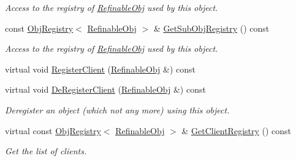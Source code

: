 \begin{DoxyCompactItemize}
\begin{DoxyCompactList}\small\item\em Access to the registry of \mbox{\hyperlink{class_obj_cryst_1_1_refinable_obj}{Refinable\+Obj}} used by this object. \end{DoxyCompactList}\item 
\mbox{\label{class_obj_cryst_1_1_refinable_obj_aa20aa3c1456578c35d2420c6668cf3aa}} 
const \mbox{\hyperlink{class_obj_cryst_1_1_obj_registry}{Obj\+Registry}}$<$ \mbox{\hyperlink{class_obj_cryst_1_1_refinable_obj}{Refinable\+Obj}} $>$ \& \mbox{\hyperlink{class_obj_cryst_1_1_refinable_obj_aa20aa3c1456578c35d2420c6668cf3aa}{Get\+Sub\+Obj\+Registry}} () const
\begin{DoxyCompactList}\small\item\em Access to the registry of \mbox{\hyperlink{class_obj_cryst_1_1_refinable_obj}{Refinable\+Obj}} used by this object. \end{DoxyCompactList}\item 
virtual void \mbox{\hyperlink{class_obj_cryst_1_1_refinable_obj_a19bf35f9dd14319f8ae79828ce67bd70}{Register\+Client}} (\mbox{\hyperlink{class_obj_cryst_1_1_refinable_obj}{Refinable\+Obj}} \&) const
\item 
\mbox{\label{class_obj_cryst_1_1_refinable_obj_abc8af6556c466bc8d2e6e6fcbaf282bb}} 
virtual void \mbox{\hyperlink{class_obj_cryst_1_1_refinable_obj_abc8af6556c466bc8d2e6e6fcbaf282bb}{De\+Register\+Client}} (\mbox{\hyperlink{class_obj_cryst_1_1_refinable_obj}{Refinable\+Obj}} \&) const
\begin{DoxyCompactList}\small\item\em Deregister an object (which not any more) using this object. \end{DoxyCompactList}\item 
\mbox{\label{class_obj_cryst_1_1_refinable_obj_aecff7bfb592d68a690bf0fb62a366dbe}} 
virtual const \mbox{\hyperlink{class_obj_cryst_1_1_obj_registry}{Obj\+Registry}}$<$ \mbox{\hyperlink{class_obj_cryst_1_1_refinable_obj}{Refinable\+Obj}} $>$ \& \mbox{\hyperlink{class_obj_cryst_1_1_refinable_obj_aecff7bfb592d68a690bf0fb62a366dbe}{Get\+Client\+Registry}} () const
\begin{DoxyCompactList}\small\item\em Get the list of clients. \end{DoxyCompactList}\item 

\end{DoxyCompactItemize}
